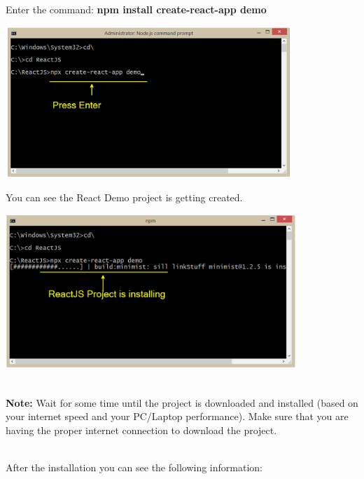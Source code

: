 \documentclass{article}
\begin{document}
 
\noindent Enter the command: \textbf{npm install create-react-app demo}
 

\begin{center}
	\noindent \includegraphics*[width=4.26in, height=2.25in]{IMG-06-32}
\end{center}

\noindent 

\newpage
\noindent You can see the React Demo project is getting created.
 

\begin{center}
	\noindent \includegraphics*[width=4.32in, height=2.30in]{IMG-06-33}
\end{center}

\noindent \textbf{}

\noindent \\
\textbf{Note:} Wait for some time until the project is downloaded and installed (based on your internet speed and your PC/Laptop performance). Make sure that you are having the proper internet connection to download the project.

 
\noindent \\
After the installation you can see the following information:
 
\end{document}
